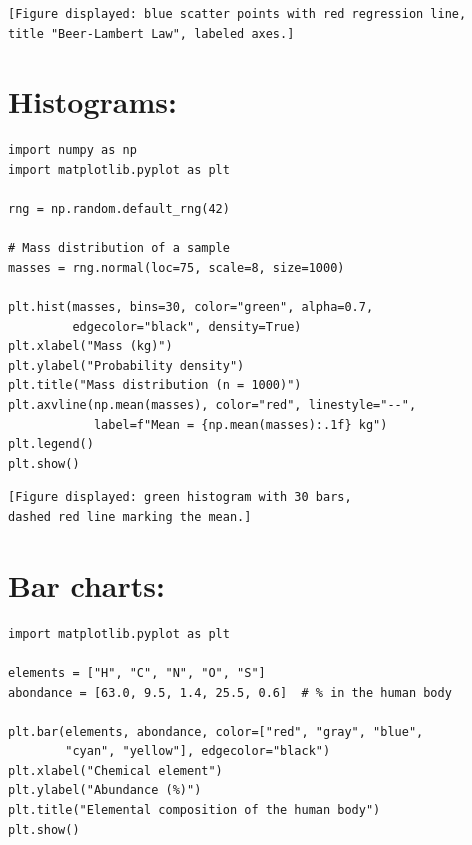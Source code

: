 \begin{codeoutput}
\begin{verbatim}
[Figure displayed: blue scatter points with red regression line,
title "Beer-Lambert Law", labeled axes.]
\end{verbatim}
\end{codeoutput}

\section{Histograms: }

\begin{codeblock}[title=\textbf{Python}]
\begin{verbatim}
import numpy as np
import matplotlib.pyplot as plt

rng = np.random.default_rng(42)

# Mass distribution of a sample
masses = rng.normal(loc=75, scale=8, size=1000)

plt.hist(masses, bins=30, color="green", alpha=0.7,
         edgecolor="black", density=True)
plt.xlabel("Mass (kg)")
plt.ylabel("Probability density")
plt.title("Mass distribution (n = 1000)")
plt.axvline(np.mean(masses), color="red", linestyle="--",
            label=f"Mean = {np.mean(masses):.1f} kg")
plt.legend()
plt.show()
\end{verbatim}
\end{codeblock}

\begin{codeoutput}
\begin{verbatim}
[Figure displayed: green histogram with 30 bars,
dashed red line marking the mean.]
\end{verbatim}
\end{codeoutput}

\section{Bar charts: }

\begin{codeblock}[title=\textbf{Python}]
\begin{verbatim}
import matplotlib.pyplot as plt

elements = ["H", "C", "N", "O", "S"]
abondance = [63.0, 9.5, 1.4, 25.5, 0.6]  # % in the human body

plt.bar(elements, abondance, color=["red", "gray", "blue",
        "cyan", "yellow"], edgecolor="black")
plt.xlabel("Chemical element")
plt.ylabel("Abundance (%)")
plt.title("Elemental composition of the human body")
plt.show()
\end{verbatim}
\end{codeblock}

